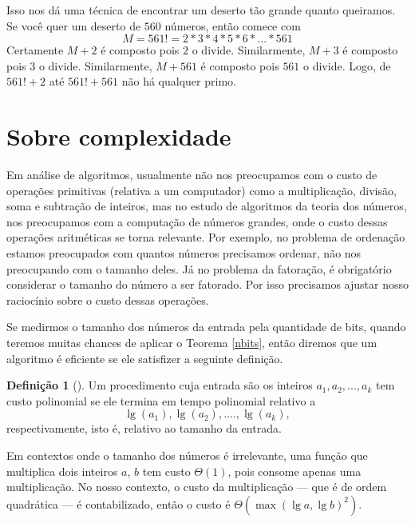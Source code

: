 \documentclass{article}
\theoremstyle{definition}
\newtheorem{definition}{Definição}[section]
\theoremstyle{pf}
\newcommand{\refth}[1]{Teorema \ref{#1}}
\newcommand{\de}[1]{\jmp\begin{definition}[#1]}
\newcommand{\ed}{\end{definition}}
\newcommand{\jmp}{\vspace{3pt}}
\begin{document}
Isso nos dá uma técnica de encontrar um deserto tão grande quanto 
queiramos. Se você quer um deserto de $560$ números, então comece com 
        $$M = 561! = 2*3*4*5*6*...*561$$
Certamente $M+2$ é composto pois $2$ o divide. Similarmente, $M+3$ é
composto pois $3$ o divide. Similarmente, $M+561$ é composto pois
$561$ o divide. Logo, de $561!+ 2$ até $561! + 561$ não há qualquer
primo.






\section{Sobre complexidade}

Em análise de algoritmos, usualmente não nos preocupamos com o custo
de operações primitivas (relativa a um computador) como a
multiplicação, divisão, soma e subtração de inteiros, mas no estudo de
algoritmos da teoria dos números, nos preocupamos com a computação de
números grandes, onde o custo dessas operações aritméticas se torna
relevante.  Por exemplo, no problema de ordenação estamos preocupados
com quantos números precisamos ordenar, não nos preocupando com o
tamanho deles.  Já no problema da fatoração, é obrigatório considerar
o tamanho do número a ser fatorado.  Por isso precisamos ajustar nosso
raciocínio sobre o custo dessas operações.

Se medirmos o tamanho dos números da entrada pela quantidade de bits,
quando teremos muitas chances de aplicar o \refth{nbits}, então
diremos que um algoritmo é eficiente se ele satisfizer a seguinte
definição.

\de{} \label{polytime} Um procedimento cuja entrada são os inteiros
$a_1, a_2, ..., a_k$ tem custo polinomial se ele termina em tempo
polinomial relativo a $$\lg(a_1), \lg(a_2), ...., \lg(a_k),$$
respectivamente, isto é, relativo ao tamanho da entrada.\ed

Em contextos onde o tamanho dos números é irrelevante, uma função que
multiplica dois inteiros $a$, $b$ tem custo $\Theta(1)$, pois consome
apenas uma multiplicação. No nosso contexto, o custo da multiplicação
--- que é de ordem quadrática --- é contabilizado, então o custo é
$\Theta(\max(\lg a,\lg b)^2)$.  
\end{document}
